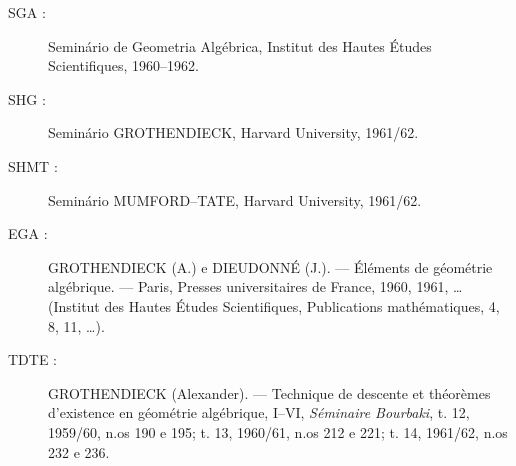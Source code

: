 \documentclass[11pt,twoside,openany]{book}
\numberwithin{equation}{section}
\newcommand{\src}[1]{%
  \phantomsection\hypertarget{src:#1}{}%
  \marginpar{\raggedleft\footnotesize\sffamily #1}%
}
\theoremstyle{plain}
\theoremstyle{definition}
\theoremstyle{remark}
\newcommand{\FgaUnitKey}{frontmatter}
\renewcommand{\src}[1]{%
  \phantomsection\hypertarget{src:\FgaUnitKey:#1}{}%
  \marginpar{\raggedleft\footnotesize\sffamily #1}%
}
\begin{document}
\begin{description}
\item[SGA :] Seminário de Geometria Algébrica, Institut des Hautes Études
Scientifiques, 1960--1962.

\src{298}
\item[SHG :] Seminário GROTHENDIECK, Harvard University, 1961/62.

\item[SHMT :] Seminário MUMFORD--TATE, Harvard University, 1961/62.

\item[EGA :] GROTHENDIECK (A.) e DIEUDONNÉ (J.). --- Éléments de géométrie
algébrique. --- Paris, Presses universitaires de France, 1960, 1961, …
(Institut des Hautes Études Scientifiques, Publications mathématiques, 4, 8,
11, …).

\item[TDTE :] GROTHENDIECK (Alexander). --- Technique de descente et théorèmes
d'existence en géométrie algébrique, I--VI, \emph{Séminaire Bourbaki}, t. 12,
1959/60, n.os 190 e 195; t. 13, 1960/61, n.os 212 e 221; t. 14, 1961/62,
n.os 232 e 236.
\end{description}

\par
\end{document}
